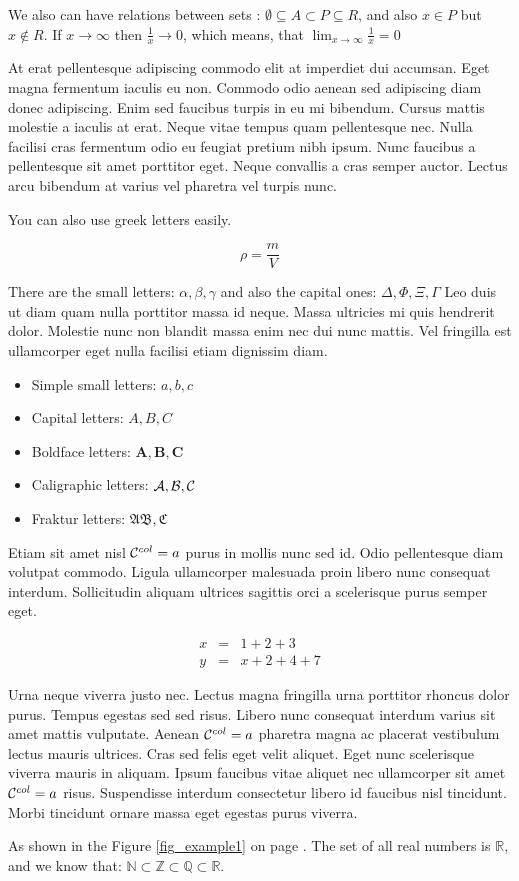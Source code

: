 \documentclass[]{article}
\begin{document}
We also can have relations between sets : $\emptyset \subseteq A \subset P \subseteq R$, and also $x \in P$ but $x \not\in R$. If $x \to \infty$ then $\frac{1}{x} \to 0$, which means, that $\lim_{x\to\infty}\frac{1}{x}=0$

At erat pellentesque adipiscing commodo elit at imperdiet dui accumsan. Eget magna fermentum iaculis eu non. Commodo odio aenean sed adipiscing diam donec adipiscing. Enim sed faucibus turpis in eu mi bibendum. Cursus mattis molestie a iaculis at erat. Neque vitae tempus quam pellentesque nec. Nulla facilisi cras fermentum odio eu feugiat pretium nibh ipsum. Nunc faucibus a pellentesque sit amet porttitor eget. Neque convallis a cras semper auctor. Lectus arcu bibendum at varius vel pharetra vel turpis nunc.

You can also use greek letters easily. 

\[
    \rho = \frac{m}{V}
\]

There are the small letters: $\alpha, \beta, \gamma$ and also the capital ones: $\Delta, \Phi, \Xi, \Gamma $
Leo duis ut diam quam nulla porttitor massa id neque. Massa ultricies mi quis hendrerit dolor. Molestie nunc non blandit massa enim nec dui nunc mattis. Vel fringilla est ullamcorper eget nulla facilisi etiam dignissim diam.
\begin{itemize}
    \item Simple small letters: $a,b,c$
    \item Capital letters: $A,B,C$
    \item Boldface letters: $\mathbf{A}, \mathbf{B}, \mathbf{C}$
    \item Caligraphic letters: $\cal A,B,C$
    \item Fraktur letters: $\mathfrak{A} \mathfrak{B}, \mathfrak{C}$
\end{itemize}

\newcommand{\CC}{{\cal C}^{col}}

Etiam sit amet nisl $\CC = a$ purus in mollis nunc sed id. Odio pellentesque diam volutpat commodo. Ligula ullamcorper malesuada proin libero nunc consequat interdum. Sollicitudin aliquam ultrices sagittis orci a scelerisque purus semper eget. 

\begin{eqnarray}
    x &=& 1 + 2 + 3 \\    
    y &=& x + 2 + 4 + 7    
\end{eqnarray}



Urna neque viverra justo nec. Lectus magna fringilla urna porttitor rhoncus dolor purus. Tempus egestas sed sed risus. Libero nunc consequat interdum varius sit amet mattis vulputate. Aenean $\CC = a$ pharetra magna ac placerat vestibulum lectus mauris ultrices. Cras sed felis eget velit aliquet. Eget nunc scelerisque viverra mauris in aliquam. Ipsum faucibus vitae aliquet nec ullamcorper sit amet $\CC = a$ risus. Suspendisse interdum consectetur libero id faucibus nisl tincidunt. Morbi tincidunt ornare massa eget egestas purus viverra.

As shown in the Figure \ref{fig_example1} on page \pageref{fig_example1}. 
The set of all real numbers is $\mathbb{R}$, and we know that: $\mathbb{N} \subset \mathbb{Z} \subset \mathbb{Q} \subset \mathbb {R}$.

\tableofcontents
\listoffigures
\listoftables
\end{document}
